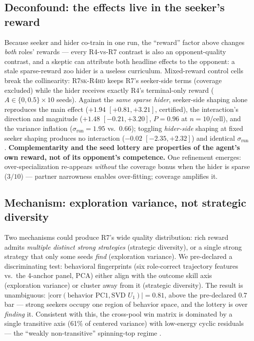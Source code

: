 \documentclass[letterpaper]{article}
\begin{document}
\subsection{Deconfound: the effects live in the seeker's reward}
\label{sec:designc-deconfound}

Because seeker and hider co-train in one run, the ``reward'' factor
above changes \emph{both} roles' rewards --- every
\textsc{R4}-vs-\textsc{R7} contrast is also an opponent-quality
contrast, and a skeptic can attribute both headline effects to the
opponent: a stale sparse-reward zoo hider is a useless curriculum.
Mixed-reward control cells break the collinearity:
\textsc{R7sk-R4hd} keeps \textsc{R7}'s seeker-side terms (coverage
excluded) while the hider receives exactly \textsc{R4}'s terminal-only
reward ($A\in\{0,0.5\}\times10$ seeds).
Against the \emph{same sparse hider}, seeker-side shaping alone
reproduces the main effect ($+1.94$ $[+0.81,+3.21]$, certified), the
interaction's direction and magnitude ($+1.48$ $[-0.21,+3.20]$,
$P{=}0.96$ at $n{=}10$/cell), and the variance inflation
($\sigma_{\text{run}}=1.95$ vs.\ $0.66$); toggling \emph{hider-side}
shaping at fixed seeker shaping produces no interaction ($-0.02$
$[-2.35,+2.32]$) and identical $\sigma_{\text{run}}$.
\textbf{Complementarity and the seed lottery are properties of the
agent's own reward, not of its opponent's competence.}
One refinement emerges: over-specialization re-appears \emph{without}
the coverage bonus when the hider is sparse ($3/10$) --- partner
narrowness enables over-fitting; coverage amplifies it.

\subsection{Mechanism: exploration variance, not strategic diversity}
\label{sec:designc-mechanism}

Two mechanisms could produce \textsc{R7}'s wide quality distribution:
rich reward admits \emph{multiple distinct strong strategies}
(strategic diversity), or a single strong strategy that only some
seeds \emph{find} (exploration variance).
We pre-declared a discriminating test: behavioral fingerprints (six
role-correct trajectory features vs.\ the 4-anchor panel, PCA) either
align with the outcome skill axis (exploration variance) or cluster
away from it (strategic diversity).
The result is unambiguous:
$|\mathrm{corr}(\text{behavior PC1}, \text{SVD } U_1)| = 0.81$,
above the pre-declared $0.7$ bar --- strong seekers occupy one region
of behavior space, and the lottery is over \emph{finding} it.
Consistent with this, the cross-pool win matrix is dominated by a
single transitive axis (61\% of centered variance) with low-energy
cyclic residuals --- the ``weakly non-transitive'' spinning-top regime
\cite{czarnecki2020spinning}.
\end{document}
